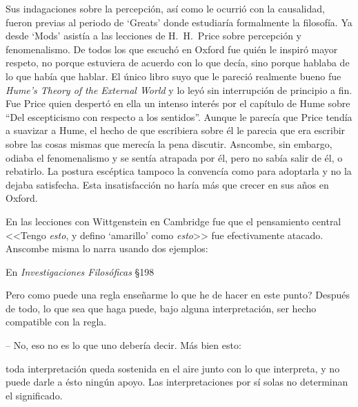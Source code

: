 Sus indagaciones sobre la percepción, así como le ocurrió con la causalidad,
fueron previas al periodo de `Greats' donde estudiaría formalmente la filosofía.
Ya desde `Mods' asistía a las lecciones de H.~H.~Price sobre percepción y
fenomenalismo. De todos los que escuchó en Oxford fue quién le inspiró mayor
respeto, no porque estuviera de acuerdo con lo que decía, sino porque hablaba de
lo que había que hablar. El único libro suyo que le pareció realmente bueno fue
\emph{Hume's Theory of the External World} y lo leyó sin interrupción de
principio a fin. Fue Price quien despertó en ella un intenso interés por el
capítulo de Hume sobre ``Del escepticismo con respecto a los sentidos''. Aunque
le parecía que Price tendía a suavizar a Hume, el hecho de que escribiera sobre
él le parecia que era escribir sobre las cosas mismas que merecía la pena
discutir. Asncombe, sin embargo, odiaba el fenomenalismo y se sentía atrapada
por él, pero no sabía salir de él, o rebatirlo. La postura escéptica tampoco la
convencía como para adoptarla y no la dejaba satisfecha. Esta insatisfacción no
haría más que crecer en sus años en Oxford.
\autocites[cf.~][p.~viii]{anscombe1981metaphysicsintro}
[~y~][p.~26]{torralba2005accion}


En las lecciones con Wittgenstein en Cambridge fue que el pensamiento central
<<Tengo \emph{esto}, y defino `amarillo' como \emph{esto}>> fue efectivamente
atacado. Anscombe misma lo narra usando dos ejemplos:


En \emph{Investigaciones Filosóficas} \S198

Pero como puede una regla enseñarme lo que he de hacer en este punto? Después de
todo, lo que sea que haga puede, bajo alguna interpretación, ser hecho
compatible con la regla.

-- No, eso no es lo que uno debería decir. Más bien esto:

toda interpretación queda sostenida en el aire junto con lo que interpreta, y no
puede darle a ésto ningún apoyo. Las interpretaciones por sí solas no determinan
el significado.

